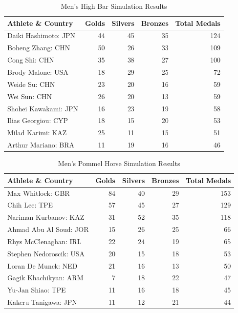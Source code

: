 \documentclass[
  10.5pt,
  letterpaper,
  DIV=11,
  numbers=noendperiod]{scrartcl}
\begin{document}
\begin{table}[H]

\caption{Men's High Bar Simulation Results }
\centering
\fontsize{9}{11}\selectfont
\begin{tabular}[t]{l|r|r|r|r}
\hline
Athlete \& Country & Golds & Silvers & Bronzes & Total Medals\\
\hline
Daiki Hashimoto: JPN & 44 & 45 & 35 & 124\\
\hline
Boheng Zhang: CHN & 50 & 26 & 33 & 109\\
\hline
Cong Shi: CHN & 35 & 38 & 27 & 100\\
\hline
Brody Malone: USA & 18 & 29 & 25 & 72\\
\hline
Weide Su: CHN & 23 & 20 & 16 & 59\\
\hline
Wei Sun: CHN & 26 & 20 & 13 & 59\\
\hline
Shohei Kawakami: JPN & 16 & 23 & 19 & 58\\
\hline
Ilias Georgiou: CYP & 18 & 15 & 20 & 53\\
\hline
Milad Karimi: KAZ & 25 & 11 & 15 & 51\\
\hline
Arthur Mariano: BRA & 11 & 19 & 16 & 46\\
\hline
\end{tabular}
\end{table}

\begin{table}[H]

\caption{Men's Pommel Horse Simulation Results }
\centering
\fontsize{9}{11}\selectfont
\begin{tabular}[t]{l|r|r|r|r}
\hline
Athlete \& Country & Golds & Silvers & Bronzes & Total Medals\\
\hline
Max Whitlock: GBR & 84 & 40 & 29 & 153\\
\hline
Chih Lee: TPE & 57 & 45 & 27 & 129\\
\hline
Nariman Kurbanov: KAZ & 31 & 52 & 35 & 118\\
\hline
Ahmad Abu Al Soud: JOR & 15 & 26 & 25 & 66\\
\hline
Rhys McClenaghan: IRL & 22 & 24 & 19 & 65\\
\hline
Stephen Nedoroscik: USA & 20 & 15 & 18 & 53\\
\hline
Loran De Munck: NED & 21 & 16 & 13 & 50\\
\hline
Gagik Khachikyan: ARM & 7 & 18 & 22 & 47\\
\hline
Yu-Jan Shiao: TPE & 11 & 16 & 18 & 45\\
\hline
Kakeru Tanigawa: JPN & 11 & 12 & 21 & 44\\
\hline
\end{tabular}
\end{table}
\end{document}
